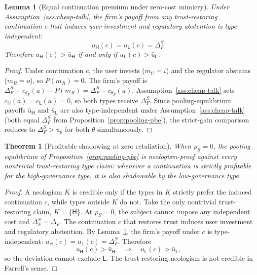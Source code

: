 \documentclass[review,authoryear]{elsarticle}
\newtheorem{lemma}{Lemma}
\newtheorem{theorem}{Theorem}
\theoremstyle{definition}
\theoremstyle{plain}
\begin{document}
\begin{lemma}[Equal continuation premium under zero-cost mimicry]
\label{lem:equal-continuation}
Under Assumption~\ref{ass:cheap-talk}, the firm's payoff from any
trust-restoring continuation $c$ that induces user investment and regulatory
abstention is type-independent:
\[
u_\mathsf{H}(c)=u_\mathsf{L}(c)=\Delta_F^S .
\]
Therefore $u_\mathsf{H}(c)>\bar u_\mathsf{H}$ if and only if
$u_\mathsf{L}(c)>\bar u_\mathsf{L}$.
\end{lemma}
\begin{proof}
Under continuation $c$, the user invests ($m_U=i$) and the regulator abstains
($m_R=o$), so $P(m_R)=0$.  The firm's payoff is
$\Delta_F^S-c_{\theta_F}(a)-P(m_R)=\Delta_F^S-c_{\theta_F}(a)$.
Assumption~\ref{ass:cheap-talk} sets $c_\mathsf{H}(a)=c_\mathsf{L}(a)=0$,
so both types receive $\Delta_F^S$.  Since pooling-equilibrium payoffs
$\bar u_\mathsf{H}$ and $\bar u_\mathsf{L}$ are also type-independent under
Assumption~\ref{ass:cheap-talk} (both equal $\Delta_F^S$ from
Proposition~\ref{prop:pooling-pbe}), the strict-gain comparison reduces to
$\Delta_F^S>\bar u_\theta$ for both $\theta$ simultaneously.
\end{proof}

\begin{theorem}[Profitable shadowing at zero retaliation]
\label{thm:zero-retaliation-shadowing}
\label{thm:neologism}
When $\rho_S=0$, the pooling equilibrium of Proposition~\ref{prop:pooling-pbe} is neologism-proof against every nontrivial trust-restoring type claim: whenever a continuation is strictly profitable for the high-governance type, it is also shadowable by the low-governance type.
\end{theorem}
\begin{proof}
A neologism $K$ is credible only if the types in $K$ strictly prefer the induced continuation $c$, while types outside $K$ do not.  Take the only nontrivial trust-restoring claim, $K=\{\mathsf{H}\}$.  At $\rho_S=0$, the subject cannot impose any independent cost and $\Delta_F^S=\Delta_F$.  The continuation $c$ that restores trust induces user investment and regulatory abstention.  By Lemma~\ref{lem:equal-continuation}, the firm's payoff under $c$ is type-independent: $u_\mathsf{H}(c)=u_\mathsf{L}(c)=\Delta_F^S$.  Therefore
\[
u_\mathsf{H}(c)>\bar u_\mathsf{H}
\quad\Longrightarrow\quad
u_\mathsf{L}(c)>\bar u_\mathsf{L},
\]
so the deviation cannot exclude $\mathsf{L}$.  The trust-restoring neologism is not credible in Farrell's sense.
\end{proof}
\end{document}
